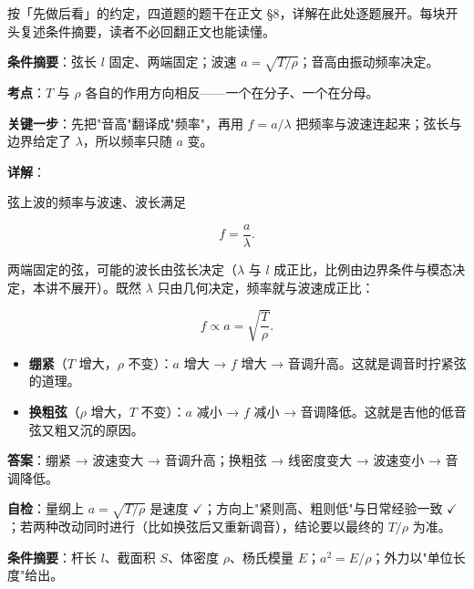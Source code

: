 \documentclass[11pt]{ctexart}
\renewcommand{\qbreak}{\needspace{0.46\textheight}}
\let\origsubhdr\subhdr
\renewcommand{\subhdr}[1]{\par\needspace{3\baselineskip}\origsubhdr{#1}}
\let\orighdr\hdr
\renewcommand{\hdr}[2]{\par\needspace{6\baselineskip}\orighdr{#1}{#2}}
\begin{document}
\flowerrule


按「先做后看」的约定，四道题的题干在正文 §8，详解在此处逐题展开。每块开头复述条件摘要，读者不必回翻正文也能读懂。

\qbreak
{}
\label{ans:q1}


\textbf{条件摘要}：弦长 $l$ 固定、两端固定；波速 $a=\sqrt{T/\rho}$；音高由振动频率决定。

\textbf{考点}：$T$ 与 $\rho$ 各自的作用方向相反——一个在分子、一个在分母。

\textbf{关键一步}：先把"音高"翻译成"频率"，再用 $f=a/\lambda$ 把频率与波速连起来；弦长与边界给定了 $\lambda$，所以频率只随 $a$ 变。

\textbf{详解}：

弦上波的频率与波速、波长满足

\[
f=\frac{a}{\lambda}.
\]

两端固定的弦，可能的波长由弦长决定（$\lambda$ 与 $l$ 成正比，比例由边界条件与模态决定，本讲不展开）。既然 $\lambda$ 只由几何决定，频率就与波速成正比：

\[
f\propto a=\sqrt{\frac{T}{\rho}}.
\]

\begin{itemize}
\item \textbf{绷紧}（$T$ 增大，$\rho$ 不变）：$a$ 增大 → $f$ 增大 → 音调升高。这就是调音时拧紧弦的道理。
\item \textbf{换粗弦}（$\rho$ 增大，$T$ 不变）：$a$ 减小 → $f$ 减小 → 音调降低。这就是吉他的低音弦又粗又沉的原因。
\end{itemize}

\textbf{答案}：绷紧 → 波速变大 → 音调升高；换粗弦 → 线密度变大 → 波速变小 → 音调降低。

\textbf{自检}：量纲上 $a=\sqrt{T/\rho}$ 是速度 $\checkmark$；方向上"紧则高、粗则低"与日常经验一致 $\checkmark$；若两种改动同时进行（比如换弦后又重新调音），结论要以最终的 $T/\rho$ 为准。

\qbreak
{}
\label{ans:q2}


\textbf{条件摘要}：杆长 $l$、截面积 $S$、体密度 $\rho$、杨氏模量 $E$；$a^2=E/\rho$；外力以"单位长度"给出。
\end{document}
